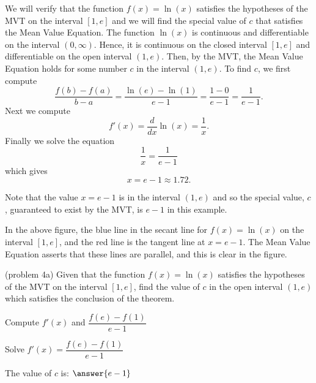 \documentclass[handout]{ximera}
\begin{document}
\begin{example}[example 4] %
We will verify that the function $f(x) = \ln(x)$ satisfies the hypotheses of the MVT
on the interval $[1,e]$ and we will find the special value of $c$ that satisfies the Mean Value Equation.
The function $\ln(x)$ is continuous and differentiable on the interval $(0, \infty)$. 
Hence, it is continuous on the closed interval $[1, e]$ and differentiable on the open interval $(1, e)$. 
Then, by the MVT,  the Mean Value Equation holds for some number 
$c$ in the interval $(1, e)$. To find $c$, we first compute
\[\frac{f(b) - f(a)}{b-a} = \frac{\ln(e) - \ln(1)}{e-1} = \frac{1 - 0}{e-1} = \frac{1}{e-1}.\]
Next we compute
\[f'(x) = \frac{d}{dx} \ln(x) = \frac{1}{x}.\]
Finally we solve the equation
\[\frac{1}{x} = \frac{1}{e-1}\]
which gives
\[ x = e-1 \approx 1.72.\]

Note that the value $x = e-1$ is in the interval $(1,e)$ and so the special value, $c$, 
guaranteed to exist by the MVT,
is $e-1$ in this example.


\begin{image}
\end{image}

In the above figure, the blue line in the secant line for $f(x) = \ln(x)$ on the interval $[1, e]$, 
and the red line is the tangent line at $x = e-1$. 
The Mean Value Equation asserts that these lines are parallel, and this
is clear in the figure.
\end{example}

\begin{problem}(problem 4a) 
  Given that the function $f(x) = \ln(x)$ satisfies the hypotheses of the MVT on the
	interval $[1,e]$, find the value of $c$ in the open interval $(1,e)$ which satisfies 
	the conclusion of the theorem.
	
    \begin{hint}
      Compute $f'(x)$ and $\dfrac{f(e) - f(1)}{e-1}$
    \end{hint}
		\begin{hint}
		  Solve $f'(x) = \dfrac{f(e) - f(1)}{e-1}$
		\end{hint}
		
		The value of $c$ is:
		 $\answer{e-1}$
\end{problem}
\end{document}

